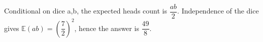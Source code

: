 Conditional on dice a,b, the expected heads count is $\dfrac{ab}{2}$. Independence of the dice gives $\mathbb{E}(ab)=(\dfrac{7}{2})^2$, hence the answer is $\boxed{\dfrac{49}{8}}$.
